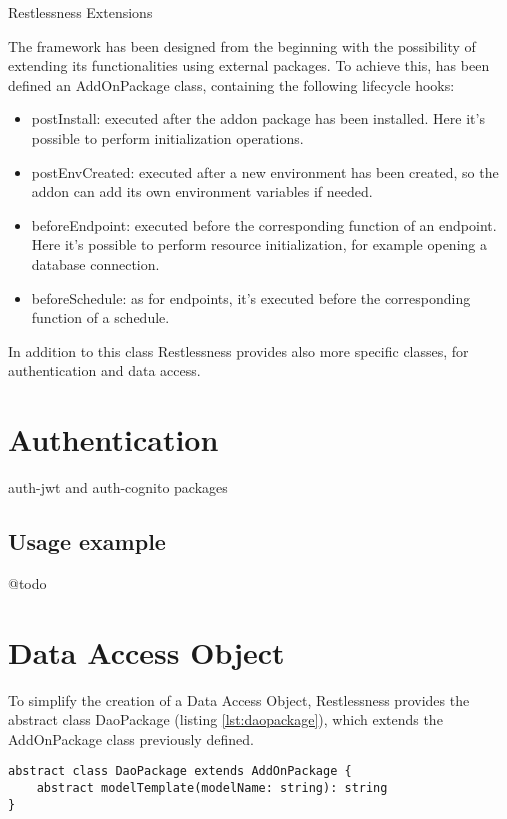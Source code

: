 \begin{chapter}{Restlessness Extensions}
    \label{chap:extensions}

    The framework has been designed from the beginning with the possibility of
    extending its functionalities using external packages.
    To achieve this, has been defined an AddOnPackage class, containing the
    following lifecycle hooks:
    \begin{itemize}
        \item postInstall: executed after the addon package has been installed.
            Here it's possible to perform initialization operations.
        \item postEnvCreated: executed after a new environment has been created,
            so the addon can add its own environment variables if needed.
        \item beforeEndpoint: executed before the corresponding function of an
            endpoint. Here it's possible to perform resource initialization,
            for example opening a database connection.
        \item beforeSchedule: as for endpoints, it's executed before the
            corresponding function of a schedule.
    \end{itemize}

    In addition to this class Restlessness provides also more specific classes,
    for authentication and data access.

    \section{Authentication}
    auth-jwt and auth-cognito packages

    \subsection{Usage example}
    @todo

    \section{Data Access Object}
    To simplify the creation of a Data Access Object, Restlessness provides the
    abstract class DaoPackage (listing \ref{lst:daopackage}), which extends the
    AddOnPackage class previously defined.

    \begin{lstlisting}[caption=DaoPackage class definition, label={lst:daopackage}]
abstract class DaoPackage extends AddOnPackage {
    abstract modelTemplate(modelName: string): string
}
    \end{lstlisting}


\end{chapter}
